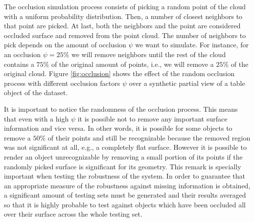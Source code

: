 The occlusion simulation process consists of picking a random point of the cloud with a uniform probability distribution. Then, a number of closest neighbors to that point are picked. At last, both the neighbors and the point are considered occluded surface and removed from the point cloud. The number of neighbors to pick depends on the amount of occlusion $\psi$ we want to simulate. For instance, for an occlusion $\psi=25\%$ we will remove neighbors until the rest of the cloud contains a $75\%$ of the original amount of points, i.e., we will remove a $25\%$ of the original cloud. Figure \ref{fig:occlusion} shows the effect of the random occlusion process with different occlusion factors $\psi$ over a synthetic partial view of a table object of the dataset.

It is important to notice the randomness of the occlusion process. This means that even with a high $\psi$ it is possible not to remove any important surface information and vice versa. In other words, it is possible for some objects to remove a $50\%$ of their points and still be recognizable because the removed region was not significant at all, e.g., a completely flat surface. However it is possible to render an object unrecognizable by removing a small portion of its points if the randomly picked surface is significant for its geometry. This remark is specially important when testing the robustness of the system. In order to guarantee that an appropriate measure of the robustness against missing information is obtained, a significant amount of testing sets must be generated and their results averaged so that it is highly probable to test against objects which have been occluded all over their surface across the whole testing set.

